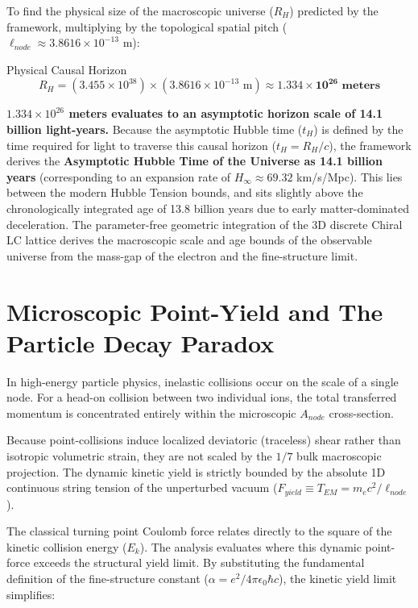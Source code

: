 To find the physical size of the macroscopic universe ($R_H$) predicted by the framework, multiplying by the topological spatial pitch ($\ell_{node} \approx 3.8616 \times 10^{-13}\text{ m}$):
\begin{resultbox}{Physical Causal Horizon}
\begin{equation}
R_H = (3.455 \times 10^{38}) \times (3.8616 \times 10^{-13}\text{ m}) \approx \mathbf{1.334 \times 10^{26}\text{ meters}}
\end{equation}
\end{resultbox}

\textbf{$1.334 \times 10^{26}$ meters evaluates to an asymptotic horizon scale of 14.1 billion light-years.} Because the asymptotic Hubble time ($t_H$) is defined by the time required for light to traverse this causal horizon ($t_H = R_H/c$), the framework derives the \textbf{Asymptotic Hubble Time of the Universe as 14.1 billion years} (corresponding to an expansion rate of $H_\infty \approx 69.32$ km/s/Mpc). This lies between the modern Hubble Tension bounds, and sits slightly above the chronologically integrated age of 13.8 billion years due to early matter-dominated deceleration. The parameter-free geometric integration of the 3D discrete Chiral LC lattice derives the macroscopic scale and age bounds of the observable universe from the mass-gap of the electron and the fine-structure limit.

\section{Microscopic Point-Yield and The Particle Decay Paradox}

In high-energy particle physics, inelastic collisions occur on the scale of a single node. For a head-on collision between two individual ions, the total transferred momentum is concentrated entirely within the microscopic $A_{node}$ cross-section.

Because point-collisions induce localized deviatoric (traceless) shear rather than isotropic volumetric strain, they are not scaled by the $1/7$ bulk macroscopic projection. The dynamic kinetic yield is strictly bounded by the absolute 1D continuous string tension of the unperturbed vacuum ($F_{yield}\equiv T_{EM}=m_{e}c^{2}/\ell_{node}$).

The classical turning point Coulomb force relates directly to the square of the kinetic collision energy ($E_{k}$). The analysis evaluates where this dynamic point-force exceeds the structural yield limit. By substituting the fundamental definition of the fine-structure constant ($\alpha=e^{2}/4\pi\epsilon_{0}\hbar c$), the kinetic yield limit simplifies:

